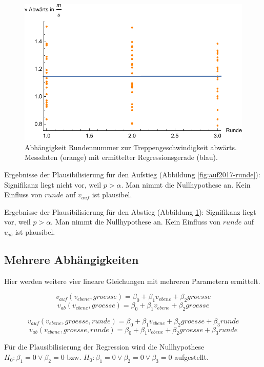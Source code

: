 \begin{figure} \centering 
	\includegraphics[]{abbildungen/regression/2017/ab-runde.pdf}
	
	\caption{Abhängigkeit Rundennummer zur Treppengeschwindigkeit abwärts. Messdaten (orange) mit ermittelter Regressionsgerade (blau). \label{fig:ab2017-runde}}
\end{figure}

Ergebnisse der Plausibilisierung für den Aufstieg
(Abbildung \ref{fig:auf2017-runde}):
Signifikanz liegt nicht vor, weil $p > \alpha$. Man nimmt die
Nullhypothese an. Kein Einfluss von $runde$ auf $v_{auf}$ ist plausibel.

Ergebnisse der Plausibilisierung für den Abstieg
(Abbildung \ref{fig:ab2017-runde}):
Signifikanz liegt vor, weil $p > \alpha$. Man nimmt die
Nullhypothese an. Kein Einfluss von $runde$ auf $v_{ab}$ ist plausibel.

\subsection{Mehrere Abhängigkeiten}

Hier werden weitere vier lineare Gleichungen mit mehreren Parametern ermittelt.

\[v_{auf}(v_{ebene}, groesse) = \beta_0 + \beta_1 v_{ebene} + \beta_2 groesse\]
\[v_{ab}(v_{ebene}, groesse) = \beta_0 + \beta_1 v_{ebene} + \beta_2 groesse\]

\[v_{auf}(v_{ebene}, groesse, runde) = \beta_0 + \beta_1 v_{ebene} + \beta_2 groesse + \beta_3 runde\]
\[v_{ab}(v_{ebene}, groesse, runde) = \beta_0 + \beta_1 v_{ebene} + \beta_2 groesse + \beta_3 runde\]

Für die Plausibilisierung der Regression wird die Nullhypothese 
$H_0: \beta_1 = 0  \lor \beta_2 = 0$ bzw. $H_0: \beta_1 = 0  \lor \beta_2 = 0 \lor \beta_3 = 0$ aufgestellt.

